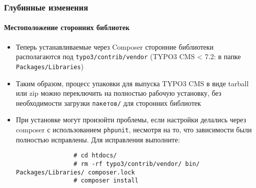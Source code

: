 \begin{frame}[fragile]
	\frametitle{Глубинные изменения}
	\framesubtitle{Местоположение сторонних библиотек}

	\begin{itemize}

		\item Теперь устанавливаемые через Composer сторонние библиотеки располагаются под \texttt{typo3/contrib/vendor}\newline
			\small
				(TYPO3 CMS < 7.2: в папке \texttt{Packages/Libraries})
			\normalsize

		\item Таким образом, процесс упаковки для выпуска TYPO3 CMS в виде tarball или zip можно переключить на
			полностью рабочую установку, без необходимости загрузки \texttt{пакетов/} для сторонних библиотек

		\item При установке могут произойти проблемы, если настройки делались через composer с использованием \texttt{phpunit},
			несмотря на то, что зависимости были полностью исправлены. Для исправления выполните:

			\begin{lstlisting}
				# cd htdocs/
				# rm -rf typo3/contrib/vendor/ bin/ Packages/Libraries/ composer.lock
				# composer install
			\end{lstlisting}
	\end{itemize}

\end{frame}

